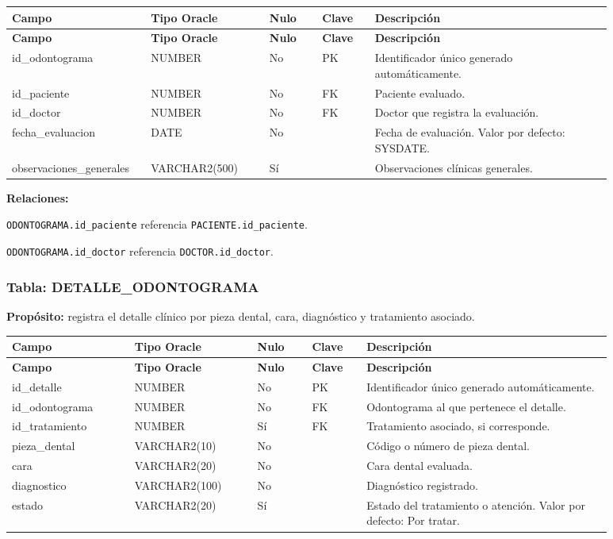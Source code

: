 \begin{longtable}{p{0.18\linewidth}p{0.18\linewidth}p{0.08\linewidth}p{0.08\linewidth}p{0.36\linewidth}}
\toprule
\textbf{Campo} & \textbf{Tipo Oracle} & \textbf{Nulo} & \textbf{Clave} & \textbf{Descripción} \\
\midrule
\endfirsthead
\toprule
\textbf{Campo} & \textbf{Tipo Oracle} & \textbf{Nulo} & \textbf{Clave} & \textbf{Descripción} \\
\midrule
\endhead
id\_odontograma & NUMBER & No & PK & Identificador único generado automáticamente. \\
id\_paciente & NUMBER & No & FK & Paciente evaluado. \\
id\_doctor & NUMBER & No & FK & Doctor que registra la evaluación. \\
fecha\_evaluacion & DATE & No &  & Fecha de evaluación. Valor por defecto: SYSDATE. \\
observaciones\_generales & VARCHAR2(500) & Sí &  & Observaciones clínicas generales. \\
\bottomrule
\end{longtable}

\textbf{Relaciones:}\par
\texttt{ODONTOGRAMA.id\_paciente} referencia \texttt{PACIENTE.id\_paciente}.\par
\texttt{ODONTOGRAMA.id\_doctor} referencia \texttt{DOCTOR.id\_doctor}.\par



\subsubsection{Tabla: DETALLE\_ODONTOGRAMA}

\textbf{Propósito:} registra el detalle clínico por pieza dental, cara, diagnóstico y tratamiento asociado.\par

\begin{longtable}{p{0.18\linewidth}p{0.18\linewidth}p{0.08\linewidth}p{0.08\linewidth}p{0.36\linewidth}}
\toprule
\textbf{Campo} & \textbf{Tipo Oracle} & \textbf{Nulo} & \textbf{Clave} & \textbf{Descripción} \\
\midrule
\endfirsthead
\toprule
\textbf{Campo} & \textbf{Tipo Oracle} & \textbf{Nulo} & \textbf{Clave} & \textbf{Descripción} \\
\midrule
\endhead
id\_detalle & NUMBER & No & PK & Identificador único generado automáticamente. \\
id\_odontograma & NUMBER & No & FK & Odontograma al que pertenece el detalle. \\
id\_tratamiento & NUMBER & Sí & FK & Tratamiento asociado, si corresponde. \\
pieza\_dental & VARCHAR2(10) & No &  & Código o número de pieza dental. \\
cara & VARCHAR2(20) & No &  & Cara dental evaluada. \\
diagnostico & VARCHAR2(100) & No &  & Diagnóstico registrado. \\
estado & VARCHAR2(20) & Sí &  & Estado del tratamiento o atención. Valor por defecto: Por tratar. \\
\bottomrule
\end{longtable}

